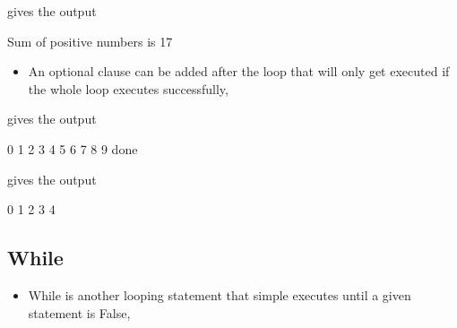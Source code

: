 \documentclass[letterpaper,10pt,english,openany]{sphinxmanual}
\begin{document}
gives the output

\begin{sphinxVerbatim}[commandchars=\\\{\}]
Sum of positive numbers is 17
\end{sphinxVerbatim}
\begin{itemize}
\item {} 
An optional  clause can be added after the loop that will
only get executed if the whole loop executes successfully,

\end{itemize}

\begin{sphinxVerbatim}[commandchars=\\\{\}]
   
         
\end{sphinxVerbatim}

gives the output

\begin{sphinxVerbatim}[commandchars=\\\{\}]
0
1
2
3
4
5
6
7
8
9
done
\end{sphinxVerbatim}

\begin{sphinxVerbatim}[commandchars=\\\{\}]
   
       
         
\end{sphinxVerbatim}

gives the output

\begin{sphinxVerbatim}[commandchars=\\\{\}]
0
1
2
3
4
\end{sphinxVerbatim}


\subsection{While}
\label{\detokenize{introduction_to_python/looping:while}}\begin{itemize}
\item {} 
While is another looping statement that simple executes until a given
statement is False,

\end{itemize}
\end{document}
